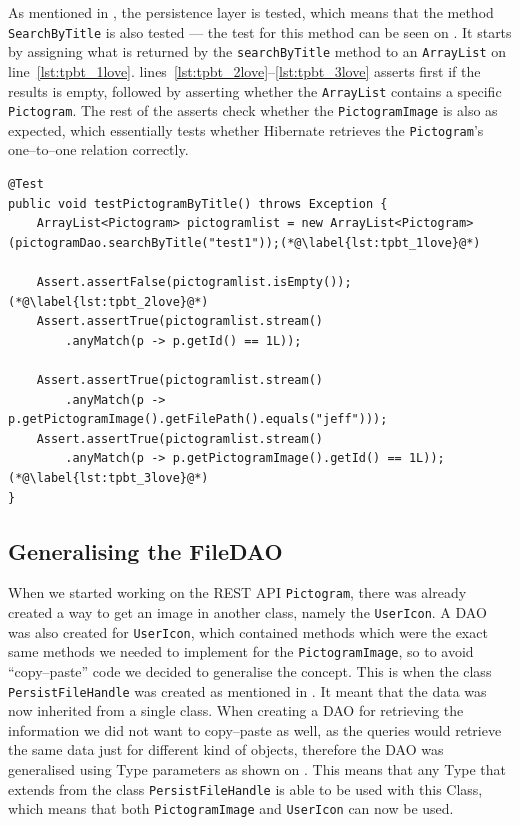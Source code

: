 As mentioned in , the persistence layer is tested, which means that the method \texttt{SearchByTitle} is also tested --- the test for this method can be seen on .
It starts by assigning what is returned by the \texttt{searchByTitle} method to an \texttt{ArrayList} on line~\ref{lst:tpbt_1love}.
lines~\ref{lst:tpbt_2love}--\ref{lst:tpbt_3love} asserts first if the results is empty, followed by asserting whether the \texttt{ArrayList} contains a specific \texttt{Pictogram}.
The rest of the asserts check whether the \texttt{PictogramImage} is also as expected, which essentially tests whether Hibernate retrieves the \texttt{Pictogram}'s one--to--one relation correctly.

\begin{lstlisting}[float, floatplacement=h, caption={The test method which tests the method \texttt{SearchByTitle}.},label={lst:pictogramByTitleTest}]
@Test
public void testPictogramByTitle() throws Exception {
    ArrayList<Pictogram> pictogramlist = new ArrayList<Pictogram>(pictogramDao.searchByTitle("test1"));(*@\label{lst:tpbt_1love}@*)

    Assert.assertFalse(pictogramlist.isEmpty());(*@\label{lst:tpbt_2love}@*)
    Assert.assertTrue(pictogramlist.stream()
        .anyMatch(p -> p.getId() == 1L));

    Assert.assertTrue(pictogramlist.stream()
        .anyMatch(p -> p.getPictogramImage().getFilePath().equals("jeff")));
    Assert.assertTrue(pictogramlist.stream()
        .anyMatch(p -> p.getPictogramImage().getId() == 1L));(*@\label{lst:tpbt_3love}@*)
}
\end{lstlisting}

\subsection{Generalising the FileDAO}\label{subsec:persistfilehandle}
When we started working on the REST API \texttt{Pictogram}, there was already created a way to get an image in another class, namely the \texttt{UserIcon}.
A DAO was also created for \texttt{UserIcon}, which contained methods which were the exact same methods we needed to implement for the \texttt{PictogramImage}, so to avoid \enquote{copy--paste} code we decided to generalise the concept.
This is when the class \texttt{PersistFileHandle} was created as mentioned in .
It meant that the data was now inherited from a single class.
When creating a DAO for retrieving the information we did not want to copy--paste as well, as the queries would retrieve the same data just for different kind of objects, therefore the DAO was generalised using Type parameters as shown on .
This means that any Type that extends from the class \texttt{PersistFileHandle} is able to be used with this Class, which means that both \texttt{PictogramImage} and \texttt{UserIcon} can now be used.


